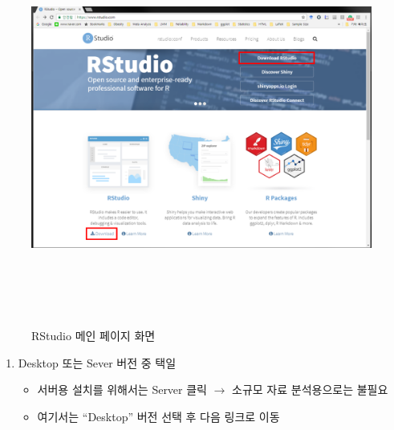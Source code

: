 \documentclass[12pt,a4paper]{book}
\providecommand{\tightlist}{%
  \setlength{\itemsep}{0pt}\setlength{\parskip}{0pt}}
\theoremstyle{definition}
\theoremstyle{definition}
\theoremstyle{definition}
\theoremstyle{remark}
\begin{document}
\begin{figure}[H]
{
  \centering
  \includegraphics[width = 13cm, height = 13cm]{Figures/Rstudio-main.png}
  \caption[RStudio 메인 페이지]{RStudio 메인 페이지 화면}\label{fig:Rstudio-install-01}
}
\end{figure}

\begin{enumerate}
\def\labelenumi{\arabic{enumi}.}
\setcounter{enumi}{1}
\tightlist
\item
  Desktop 또는 Sever 버전 중 택일

  \begin{itemize}
  \tightlist
  \item
    서버용 설치를 위해서는 Server 클릭 \(\rightarrow\) 소규모 자료
    분석용으로는 불필요
  \item
    여기서는 ``Desktop'' 버전 선택 후 다음 링크로 이동
  \end{itemize}
\end{enumerate}
\end{document}

